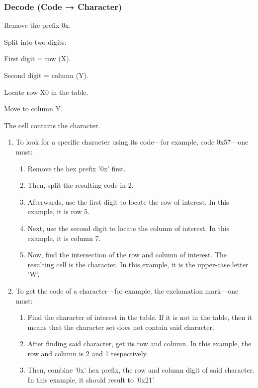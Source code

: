 \subsubsection{Decode (Code → Character)}

Remove the prefix 0x.

Split into two digits:

First digit = row (X).

Second digit = column (Y).

Locate row X0 in the table.

Move to column Y.

The cell contains the character.

\begin{enumerate}
  \item To look for a specific character using its code---for example, code 0x57---one must:
    \begin{enumerate}[label=\alph*.]
      \item Remove the hex prefix '0x' first.
      \item Then, split the resulting code in 2.
      \item Afterwards, use the first digit to locate the row of interest. In this example, it is row 5.
      \item Next, use the second digit to locate the column of interest. In this example, it is column 7.
      \item Now, find the intersection of the row and column of interest. The resulting cell is the character. In this example, it is the upper-case letter 'W'.
    \end{enumerate}
  \item To get the code of a character---for example, the exclamation mark---one must:
    \begin{enumerate}[label=\alph*.]
      \item Find the character of interest in the table. If it is not in the table, then it means that the character set does not contain said character.
      \item After finding said character, get its row and column. In this example, the row and column is 2 and 1 respectively.
      \item Then, combine '0x' hex prefix, the row and column digit of said character. In this example, it should result to '0x21'.
    \end{enumerate}
\end{enumerate}


